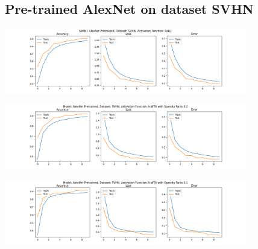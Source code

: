 \documentclass[a4paper]{article}
\begin{document}
		\subsection{Pre-trained AlexNet on dataset SVHN}
			\begin{center}
				\centering
				\includegraphics[width=400px,keepaspectratio]{Results/AlexNet_SVHN_ReLU_Pretrained.png}
			\end{center}
			\begin{center}
				\centering
				\includegraphics[width=400px,keepaspectratio]{Results/AlexNet_SVHN_k-WTA_0.2_Pretrained.png}
			\end{center}
			\begin{center}
				\centering
				\includegraphics[width=400px,keepaspectratio]{Results/AlexNet_SVHN_k-WTA_0.1_Pretrained.png}
			\end{center}
		
\end{document}
